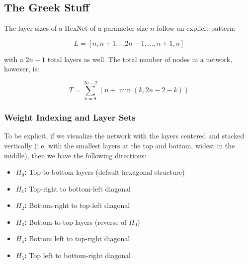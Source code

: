 
\subsection{The Greek Stuff}


The layer sizes of a HexNet of a parameter size $n$ follow an explicit pattern:

\[L = [n, n+1, ... 2n-1, ..., n+1, n]\]

with a $2n-1$ total layers as well.
The total number of nodes in a network, however, is:

\[T = \sum_{k=0}^{2n-2} (n + \min(k, 2n-2-k))\]


\subsubsection{Weight Indexing and Layer Sets}

To be explicit, if we visualize the network with the layers centered and stacked vertically (i.e. with the smallest layers at the top and bottom, widest in the middle), then we have the following directions:
\begin{itemize}
    \item \textbf{$H_0$:} Top-to-bottom layers (default hexagonal structure)
    \item \textbf{$H_1$:} Top-right to bottom-left diagonal
    \item \textbf{$H_2$:} Bottom-right to top-left diagonal
    \item \textbf{$H_3$:} Bottom-to-top layers (reverse of $H_0$)
    \item \textbf{$H_4$:} Bottom left to top-right diagonal
    \item \textbf{$H_5$:} Top left to bottom-right diagonal
\end{itemize}

